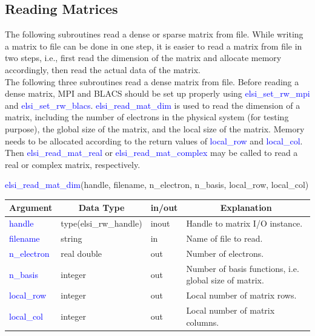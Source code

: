\documentclass{report}
\begin{document}
\subsection{Reading Matrices}
\label{subsec:rw_read}
The following subroutines read a dense or sparse matrix from file.  While writing a matrix to file can be done in one step, it is easier to read a matrix from file in two steps, i.e., first read the dimension of the matrix and allocate memory accordingly, then read the actual data of the matrix.\\

The following three subroutines read a dense matrix from file.  Before reading a dense matrix, MPI and BLACS should be set up properly using \textcolor{blue}{elsi\_set\_rw\_mpi} and \textcolor{blue}{elsi\_set\_rw\_blacs}.  \textcolor{blue}{elsi\_read\_mat\_dim} is used to read the dimension of a matrix, including the number of electrons in the physical system (for testing purpose), the global size of the matrix, and the local size of the matrix.  Memory needs to be allocated according to the return values of \textcolor{blue}{local\_row} and \textcolor{blue}{local\_col}.  Then \textcolor{blue}{elsi\_read\_mat\_real} or \textcolor{blue}{elsi\_read\_mat\_complex} may be called to read a real or complex matrix, respectively.\\

\begin{labeling}{\hspace{6cm}}
\item [\hspace{0.3cm} \textcolor{blue}{elsi\_read\_mat\_dim}(handle, filename, n\_electron, n\_basis, local\_row, local\_col)]
\end{labeling}

\begin{tabular}[]{|p{20mm}|p{45mm}|p{15mm}|p{85mm}|}
\hline
\multicolumn{1}{|c|}{\textbf{Argument}} & \multicolumn{1}{c|}{\textbf{Data Type}} & \multicolumn{1}{c|}{\textbf{in/out}} & \multicolumn{1}{c|}{\textbf{Explanation}}\\
\hline
\textcolor{blue}{handle}      & type(elsi\_rw\_handle) & inout & Handle to matrix I/O instance.\\
\hline
\textcolor{blue}{filename}    & string                 & in    & Name of file to read.\\
\hline
\textcolor{blue}{n\_electron} & real double            & out   & Number of electrons.\\
\hline
\textcolor{blue}{n\_basis}    & integer                & out   & Number of basis functions, i.e. global size of matrix.\\
\hline
\textcolor{blue}{local\_row}  & integer                & out   & Local number of matrix rows.\\
\hline
\textcolor{blue}{local\_col}  & integer                & out   & Local number of matrix columns.\\
\hline
\end{tabular}
\end{document}
